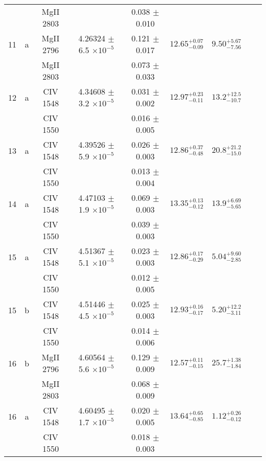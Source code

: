 \documentclass[12pt]{article}
\begin{document}
\begin{footnotesize}
\begin{longtable}{ c c c c c c c c c}
  &   & MgII     2803  &  &  0.038 $\pm$ 0.010   &   &     & 	 & \\ 
      11  & a  & MgII     2796  &  4.26324 $\pm$ 6.5 $\times 10^{-5}$   &  0.121 $\pm$ 0.017   & $12.65_{ - 0.09}^{ + 0.07}$  & $9.50_{ - 7.56}^{ + 5.67}$    & 	 & \\ 
  &   & MgII     2803  &  &  0.073 $\pm$ 0.033   &   &     & 	 & \\ 
      12  & a  & CIV     1548  &  4.34608 $\pm$ 3.2 $\times 10^{-5}$   &  0.031 $\pm$ 0.002   & $12.97_{ - 0.11}^{ + 0.23}$  & $13.2_{ - 10.7}^{ + 12.5}$    & 	 & \\ 
  &   & CIV     1550  &  &  0.016 $\pm$ 0.005   &   &     & 	 & \\ 
      13  & a  & CIV     1548  &  4.39526 $\pm$ 5.9 $\times 10^{-5}$   &  0.026 $\pm$ 0.003   & $12.86_{ - 0.48}^{ + 0.37}$  & $20.8_{ - 15.0}^{ + 21.2}$    & 	 & \\ 
  &   & CIV     1550  &  &  0.013 $\pm$ 0.004   &   &     & 	 & \\ 
      14  & a  & CIV     1548  &  4.47103 $\pm$ 1.9 $\times 10^{-5}$   &  0.069 $\pm$ 0.003   & $13.35_{ - 0.12}^{ + 0.13}$  & $13.9_{ - 5.65}^{ + 6.69}$    & 	 & \\ 
  &   & CIV     1550  &  &  0.039 $\pm$ 0.003   &   &     & 	 & \\ 
      15  & a  & CIV     1548  &  4.51367 $\pm$ 5.1 $\times 10^{-5}$   &  0.023 $\pm$ 0.003   & $12.86_{ - 0.29}^{ + 0.17}$  & $5.04_{ - 2.85}^{ + 9.60}$    & 	 & \\ 
  &   & CIV     1550  &  &  0.012 $\pm$ 0.005   &   &     & 	 & \\ 
      15  & b  & CIV     1548  &  4.51446 $\pm$ 4.5 $\times 10^{-5}$   &  0.025 $\pm$ 0.003   & $12.93_{ - 0.17}^{ + 0.16}$  & $5.20_{ - 3.11}^{ + 12.2}$    & 	 & \\ 
  &   & CIV     1550  &  &  0.014 $\pm$ 0.006   &   &     & 	 & \\ 
      16  & b  & MgII     2796  &  4.60564 $\pm$ 5.6 $\times 10^{-5}$   &  0.129 $\pm$ 0.009   & $12.57_{ - 0.15}^{ + 0.11}$  & $25.7_{ - 1.84}^{ + 1.38}$    & 	 & \\ 
  &   & MgII     2803  &  &  0.068 $\pm$ 0.009   &   &     & 	 & \\ 
      16  & a  & CIV     1548  &  4.60495 $\pm$ 1.7 $\times 10^{-5}$   &  0.020 $\pm$ 0.005   & $13.64_{ - 0.85}^{ + 0.65}$  & $1.12_{ - 0.12}^{ + 0.26}$    & 	 & \\ 
  &   & CIV     1550  &  &  0.018 $\pm$ 0.003   &   &     & 	 & \\ 

\end{longtable}
\end{footnotesize}
\end{document}
